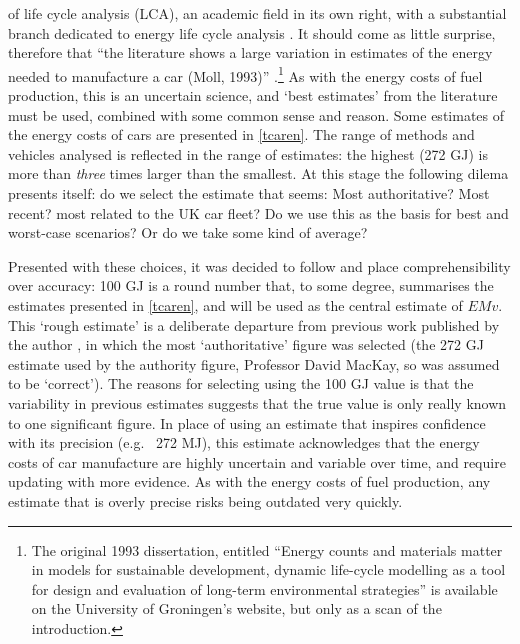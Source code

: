\documentclass[a4paper, 11pt, twoside]{Thesis}
\begin{document}
of life cycle analysis (LCA), an academic field in its own right, with a
substantial branch dedicated to energy life cycle analysis \citep{kuemmel1997life,
cornelissen2002value}. It should come as little surprise, therefore that
``the literature shows a large variation in estimates of the energy needed to
manufacture a car (Moll, 1993)''
\citep[p.139]{Wee2000}.\footnote{The original 1993 dissertation, entitled
``Energy counts and materials matter in models for sustainable development,
dynamic life-cycle modelling as a tool for design and evaluation of long-term
environmental strategies'' is available on the University of Groningen's
website, but only as a scan of the introduction.
}
As with the energy
costs of fuel production, this is an uncertain science, and `best estimates'
from the literature must be used, combined with some common
sense and reason. Some estimates of the energy costs of cars are presented in
\cref{tcaren}. The range of methods and vehicles analysed is reflected in
the range of estimates: the highest (272 GJ) is more than \emph{three} times
larger than the smallest. At this stage the following dilema presents itself:
do we select the estimate that seems: Most authoritative? Most recent?
most related to the UK car fleet? Do we use this as the basis for best
and worst-case scenarios? Or do we take some kind of average?

Presented with these choices, it was decided to follow \citet{MacKay2009} and
place comprehensibility over accuracy: 100 GJ is a round number
that, to some degree, summarises the estimates presented in
\cref{tcaren}, and will be used as the central estimate of $EMv$.
This `rough estimate' is a deliberate
departure from previous work published by the author
\citep{Lovelace2011-assessing}, in which the most
`authoritative' figure was selected (the 272 GJ estimate used by the
authority figure, Professor David MacKay, so was assumed to be
`correct'). The reasons for selecting using the 100 GJ value is that the
variability in previous estimates suggests that the true value is
only really known to one significant figure. In place of using an
estimate that inspires confidence with its precision (e.g.~ 272 MJ),
this estimate acknowledges that the energy costs of car manufacture are highly
uncertain and variable over time, and require updating with more evidence. As
with the energy costs of fuel production, any estimate that is overly precise
risks being outdated very quickly.
\end{document}
